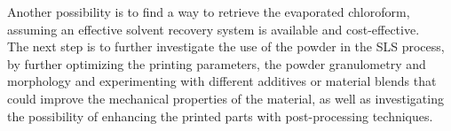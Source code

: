 \documentclass{article}
\begin{document}
    Another possibility is to find a way to retrieve the evaporated chloroform, assuming an effective solvent recovery 
    system is available and cost-effective. \\ 

    The next step is to further investigate the use of the powder in the SLS process, by further optimizing the 
    printing parameters, the powder granulometry and morphology and experimenting with different additives or material blends that 
    could improve the mechanical properties of the material, as well as investigating the possibility of enhancing the printed parts 
    with post-processing techniques. \\ 


    \clearpage


    \printbibliography
\end{document}
